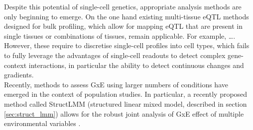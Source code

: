 Despite this potential of single-cell genetics, appropriate analysis methods are only beginning to emerge. 
On the one hand existing multi-tissue eQTL methods designed for bulk profiling, which allow for mapping eQTL that are present in single tissues or combinations of tissues, remain applicable. 
For example, …\cite{flutre2013statistical, urbut2019flexible}.
However, these require to discretise single-cell profiles into cell types, which fails to fully leverage the advantages of single-cell readouts to detect complex gene-context interactions, in particular the ability to detect continuous changes and gradients. \\

Recently, methods to assess GxE using larger numbers of conditions have emerged in the context of population studies.
In particular, a recently proposed method called StructLMM (structured linear mixed model, described in section \ref{sec:struct_lmm}) allows for the robust joint analysis of GxE effect of multiple environmental variables \cite{moore2019linear}. \\





